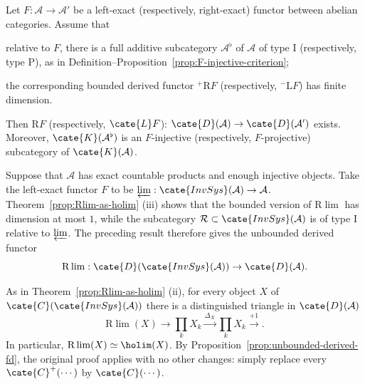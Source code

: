 \begin{proposition}\label{prop:unbounded-derived-fd}
	Let $F:\mathcal{A}\to\mathcal{A}'$ be a left-exact (respectively,
	right-exact) functor between abelian categories. Assume that
	\begin{compactitem}
		\item relative to $F$, there is a full additive subcategory
		$\mathcal{A}^\flat$ of $\mathcal{A}$ of type I (respectively, type P),
		as in Definition--Proposition~\ref{prop:F-injective-criterion};
		\item the corresponding bounded derived functor
		${}^+\mathrm{R}F$ (respectively, ${}^-\mathrm{L}F$) has finite
		dimension.
	\end{compactitem}
	Then $\mathrm{R}F$ (respectively, $\cate{L}F$):
	$\cate{D}(\mathcal{A})\to\cate{D}(\mathcal{A}')$ exists. Moreover,
	$\cate{K}(\mathcal{A}^\flat)$ is an $F$-injective (respectively,
	$F$-projective) subcategory of $\cate{K}(\mathcal{A})$.
\end{proposition}

\begin{example}\label{eg:Rlim-unbounded}
	Suppose that $\mathcal{A}$ has exact countable products and enough
	injective objects. Take the left-exact functor $F$ to be
	$\varprojlim:\cate{InvSys}(\mathcal{A})\to\mathcal{A}$.
	Theorem~\ref{prop:Rlim-as-holim} (iii) shows that the bounded version of
	$\mathrm{R}\lim$ has dimension at most $1$, while the subcategory
	$\mathcal{R}\subset\cate{InvSys}(\mathcal{A})$ is of type I relative to
	$\varprojlim$. The preceding result therefore gives the unbounded derived functor
	\[ \mathrm{R}\lim: \cate{D}(\cate{InvSys}(\mathcal{A})) \to \cate{D}(\mathcal{A}). \]

	As in Theorem~\ref{prop:Rlim-as-holim} (ii), for every object $X$ of
	$\cate{C}(\cate{InvSys}(\mathcal{A}))$ there is a distinguished triangle
	in $\cate{D}(\mathcal{A})$
	\[ \mathrm{R}\lim(X) \to \prod_k X_k \xrightarrow{\Delta_X} \prod_k X_k \xrightarrow{+1} . \]
	In particular, $\mathrm{R}\lim(X)\simeq\holim(X)$. By
	Proposition~\ref{prop:unbounded-derived-fd}, the original proof applies with
	no other changes: simply replace every $\cate{C}^+(\cdots)$ by
	$\cate{C}(\cdots)$.
\end{example}
